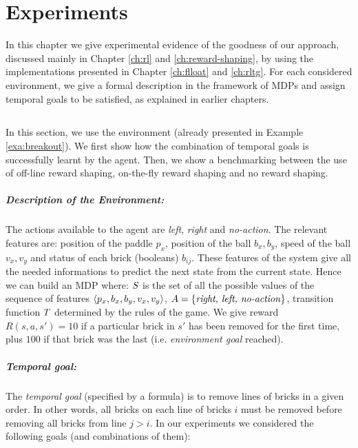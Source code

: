 \chapter{Experiments}\label{ch:experiments}

In this chapter we give experimental evidence of the goodness of our approach, discussed mainly in Chapter \ref{ch:rl} and \ref{ch:reward-shaping}, by using the implementations presented in Chapter \ref{ch:flloat} and \ref{ch:rltg}. For each considered environment, we give a formal description in the framework of MDPs and assign temporal goals to be satisfied, as explained in earlier chapters.
\section{\Breakout}
In this section, we use the \Breakout environment (already presented in Example \ref{exa:breakout}). We first show how the combination of temporal goals is successfully learnt by the agent. Then, we show a benchmarking between the use of off-line reward shaping, on-the-fly reward shaping and no reward shaping.
\paragraph{Description of the Environment:}
The actions available to the agent are \emph{left}, \emph{right} and \emph{no-action}. The relevant features are: position of the paddle $p_x$, position of the ball $b_x, b_y$, speed of the ball $v_x, v_y$ and status of each brick (booleans) $b_{ij}$. These features of the system give all the needed informations to predict the next state from the current state. Hence we can build an MDP where: $S$ is the set of  all the possible values of the sequence of features $\langle p_x, b_x, b_y, v_x, v_y \rangle$, $A = \{\text{\emph{right, left, no-action}}\}$, transition function $T$ determined by the rules of the game. We give reward $R(s,a,s')=10$ if a particular brick in $s'$ has been removed for the first time, plus $100$ if that brick was the last (i.e. \emph{environment goal} reached).

\paragraph{Temporal goal:} The \emph{temporal goal} (specified by a \LLf formula) is to remove lines of bricks in a given order. In other words, all bricks on each line of bricks $i$ must be removed before removing all bricks from line $j > i$.
In our experiments we considered the following goals (and combinations of them):

